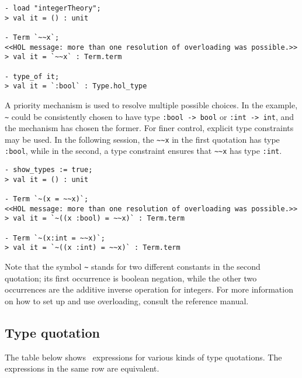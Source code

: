 \setcounter{sessioncount}{1}
\begin{session}\begin{verbatim}
- load "integerTheory";
> val it = () : unit

- Term `~~x`;
<<HOL message: more than one resolution of overloading was possible.>>
> val it = `~~x` : Term.term

- type_of it;
> val it = `:bool` : Type.hol_type
\end{verbatim}\end{session}

A priority mechanism is used to resolve multiple possible choices. In
the example, {\small\verb+~+} could be consistently chosen to have type
{\small\verb+:bool -> bool+} or {\small\verb+:int -> int+}, and the
mechanism has chosen the former. For finer control, explicit type
constraints may be used. In the following session, the 
{\small\verb+~~x+} in the first quotation has type {\small\verb+:bool+},
while in the second, a type constraint ensures that {\small\verb+~~x+} has
type {\small\verb+:int+}. 

\begin{session}\begin{verbatim}
- show_types := true;
> val it = () : unit

- Term `~(x = ~~x)`;
<<HOL message: more than one resolution of overloading was possible.>>
> val it = `~((x :bool) = ~~x)` : Term.term

- Term `~(x:int = ~~x)`;
> val it = `~((x :int) = ~~x)` : Term.term
\end{verbatim}\end{session}

Note that the symbol {\small\verb+~+} stands for two different constants in
the second quotation; its first occurrence is boolean negation, while
the other two occurrences are the additive inverse operation for integers.
For more information on how to set up and use overloading, consult the
reference manual.


\subsection{Type quotation}

The table below shows \ML\ expressions for various kinds of type
quotations.
The expressions in the same row are equivalent.

